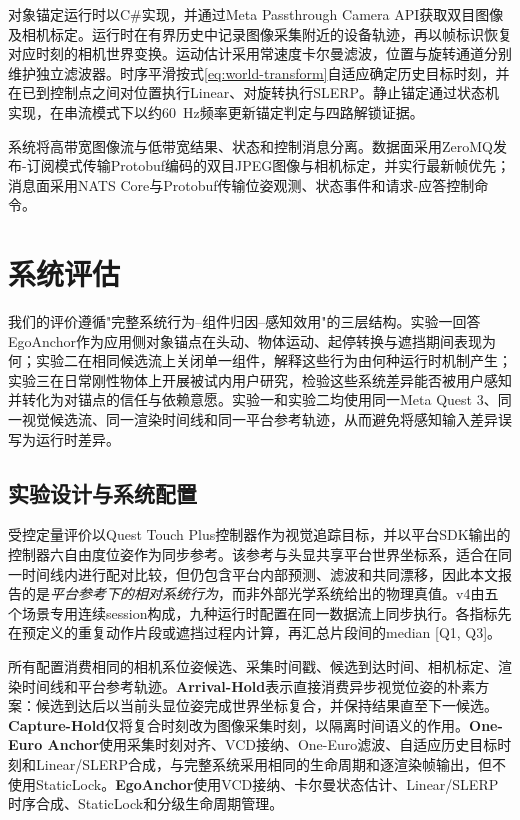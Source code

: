\documentclass[review]{vgtc}
\begin{document}
对象锚定运行时以C\#实现，并通过Meta Passthrough Camera API获取双目图像及相机标定。运行时在有界历史中记录图像采集附近的设备轨迹，再以帧标识恢复对应时刻的相机世界变换。运动估计采用常速度卡尔曼滤波，位置与旋转通道分别维护独立滤波器。时序平滑按式\ref{eq:world-transform}自适应确定历史目标时刻，并在已到控制点之间对位置执行Linear、对旋转执行SLERP。静止锚定通过状态机实现，在串流模式下以约60~Hz频率更新锚定判定与四路解锁证据。

系统将高带宽图像流与低带宽结果、状态和控制消息分离。数据面采用ZeroMQ发布-订阅模式传输Protobuf编码的双目JPEG图像与相机标定，并实行最新帧优先；消息面采用NATS Core与Protobuf传输位姿观测、状态事件和请求-应答控制命令。

\section{系统评估}\label{sec:evaluation}

我们的评价遵循"完整系统行为--组件归因--感知效用"的三层结构。实验一回答EgoAnchor作为应用侧对象锚点在头动、物体运动、起停转换与遮挡期间表现为何；实验二在相同候选流上关闭单一组件，解释这些行为由何种运行时机制产生；实验三在日常刚性物体上开展被试内用户研究，检验这些系统差异能否被用户感知并转化为对锚点的信任与依赖意愿。实验一和实验二均使用同一Meta Quest 3、同一视觉候选流、同一渲染时间线和同一平台参考轨迹，从而避免将感知输入差异误写为运行时差异。

\subsection{实验设计与系统配置}

受控定量评价以Quest Touch Plus控制器作为视觉追踪目标，并以平台SDK输出的控制器六自由度位姿作为同步参考。该参考与头显共享平台世界坐标系，适合在同一时间线内进行配对比较，但仍包含平台内部预测、滤波和共同漂移，因此本文报告的是\emph{平台参考下的相对系统行为}，而非外部光学系统给出的物理真值。v4由五个场景专用连续session构成，九种运行时配置在同一数据流上同步执行。各指标先在预定义的重复动作片段或遮挡过程内计算，再汇总片段间的median [Q1, Q3]。

所有配置消费相同的相机系位姿候选、采集时间戳、候选到达时间、相机标定、渲染时间线和平台参考轨迹。\textbf{Arrival-Hold}表示直接消费异步视觉位姿的朴素方案：候选到达后以当前头显位姿完成世界坐标复合，并保持结果直至下一候选。\textbf{Capture-Hold}仅将复合时刻改为图像采集时刻，以隔离时间语义的作用。\textbf{One-Euro Anchor}使用采集时刻对齐、VCD接纳、One-Euro滤波、自适应历史目标时刻和Linear/SLERP合成，与完整系统采用相同的生命周期和逐渲染帧输出，但不使用StaticLock。\textbf{EgoAnchor}使用VCD接纳、卡尔曼状态估计、Linear/SLERP时序合成、StaticLock和分级生命周期管理。
\end{document}
